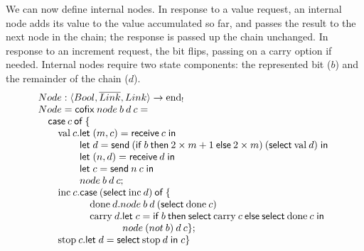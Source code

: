 \documentclass[orivec,envcountsame]{llncs}
\makeatletter
\newcommand{\gvdual}[1]{\overline{#1}}
\newcommand{\uto}{\ensuremath{\rightarrow}}
\newcommand{\outterm}{\mathrm{end}_!}
\newcommand{\mkwd}[1]{\mathsf{#1}}
\newcommand{\clabel}[1]{\mathrm{#1}}
\newcommand{\gvsend}[2]{\mkwd{send}\:#1\:#2}
\newcommand{\gvreceive}[1]{\mkwd{receive}\:#1}
\newcommand{\gvlet}[3]{\mkwd{let}\;#1 = #2\;\mkwd{in}\;#3}
\newcommand{\gvselect}[2]{\mkwd{select}\:#1\:#2}
\newcommand{\lrkwd}{\mkwd{cofix}}
\newcommand{\gvifthen}[3]{\mkwd{if}\:#1\:\mkwd{then}\:#2\:\mkwd{else}\:#3}
\newcommand{\ba}{\begin{array}}
\newcommand{\ea}{\end{array}}
\newcommand{\bl}{\ba[t]{@{}l@{}}}
\newcommand{\el}{\ea}
\makeatother
\begin{document}
We can now define internal nodes. In response to a value request, an internal node adds its value to
the value accumulated so far, and passes the result to the next node in the chain; the response is
passed up the chain unchanged. In response to an increment request, the bit flips, passing on a
carry option if needed. Internal nodes require two state components: the represented bit ($b$) and
the remainder of the chain ($d$).
%
\[
\bl
Node : \langle Bool, \gvdual{Link}, Link \rangle \uto \outterm \\
Node = \lrkwd\:node\:b\:d\:c = \\
\quad
  \bl
  \mkwd{case}\:c\:\mkwd{of}\:\{ \\
    \quad
      \bl
      \clabel{val}\:c.
        \bl
        \gvlet{(m,c)}{\gvreceive{c}}{} \\
        \gvlet{d}{\gvsend{(\gvifthen{b}{2 \times m + 1}{2 \times m})}{(\gvselect{\clabel{val}}{d})}}{} \\
        \gvlet{(n,d)}{\gvreceive{d}}{} \\
        \gvlet{c}{\gvsend{n}{c}}{} \\
        node\:b\:d\:c; \\
        \el \\
      \clabel{inc}\:c.
        \bl
        \mkwd{case}\:(\gvselect{\clabel{inc}}{d})\:\mkwd{of}\:\{ \\
        \quad
          \bl
          \clabel{done}\:d. node\:b\:d\:(\gvselect{\clabel{done}}{c}) \\
          \clabel{carry}\:d.
            \bl
            \gvlet{c}{\gvifthen{b}{\gvselect{\clabel{carry}}{c}}{\gvselect{\clabel{done}}{c}}}{} \\
            node\:(not\:b)\:d\:c \}; \\
            \el \\
          \el \\
        \el \\
      \clabel{stop}\:c. \gvlet{d}{\gvselect{\clabel{stop}}{d}}{c} \} \\
      \el \\
  \el \\
\el
\]
\end{document}

